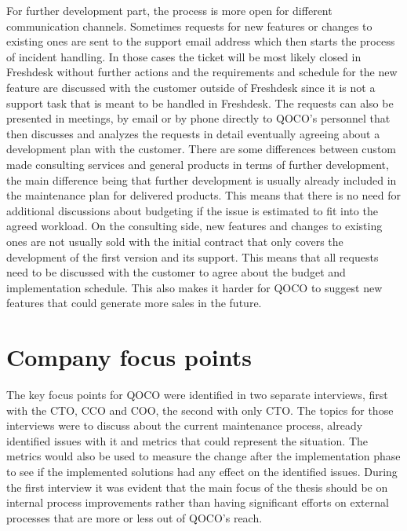 For further development part, the process is more open for different communication channels. Sometimes requests for new features or changes to existing ones are sent to
the support email address which then starts the process of incident handling. In those cases the ticket will be most likely closed in Freshdesk without further actions
and the requirements and schedule for the new feature are discussed with the customer outside of Freshdesk since it is not a support task that is meant to be handled in Freshdesk.
The requests can also be presented in meetings, by email or by phone directly to QOCO's personnel that then discusses and analyzes the requests in detail eventually agreeing about a development
plan with the customer. There are some differences between custom made consulting services and general products in terms of further development, the main difference
being that further development is usually already included in the maintenance plan for delivered products. This means that there is no need for additional discussions
about budgeting if the issue is estimated to fit into the agreed workload. On the consulting side, new features and changes to existing ones are not usually sold with the initial
contract that only covers the development of the first version and its support. This means that all requests need to be discussed with the customer to agree about the
budget and implementation schedule. This also makes it harder for QOCO to suggest new features that could generate more sales in the future.

\section{Company focus points}
\label{section:focus-points}

The key focus points for QOCO were identified in two separate interviews, first with the CTO, CCO and COO, the second with only CTO. The topics for those interviews were to
discuss about the current maintenance process, already identified issues with it and metrics that could represent the situation. The metrics would also be used to measure
the change after the implementation phase to see if the implemented solutions had any effect on the identified issues. During the first interview it was evident that the main
focus of the thesis should be on internal process improvements rather than having significant efforts on external processes that are more or less out of QOCO's reach.

